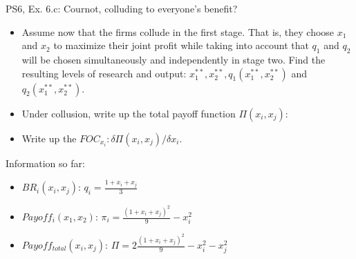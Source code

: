 \begin{frame}{PS6, Ex. 6.c: Cournot, colluding to everyone's benefit?}
    \begin{itemize}
    \item[(c)] Assume now that the firms collude in the first stage. That is, they choose $x_1$ and $x_2$ to maximize their joint profit while taking into account that $q_1$ and $q_2$ will be chosen simultaneously and independently in stage two. Find the resulting levels of research and output: $x_1^{**},x_2^{**},q_1(x_1^{**},x_2^{**})$ and $q_2(x_1^{**},x_2^{**})$.
    \end{itemize}
  \begin{multicols}{2}
    \begin{itemize}
      \item[(Step a)] Under collusion, write up the total payoff function $\Pi(x_i,x_j)$:
      \item[(Step b)] Write up the $FOC_{x_i}:\delta\Pi(x_i,x_j)/\delta x_i$.
    \end{itemize}
    \vfill\null \columnbreak
    Information so far:
    \begin{itemize}
      \item[1] $BR_i(x_i,x_j)$: $q_i = \frac{1+x_i+x_j}{3}$
      \item[2] $Payoff_i(x_1,x_2)$: $\pi_i=\frac{(1+x_i+x_j)^2}{9}-x_i^2$
      \item[3] $Payoff_{total}(x_i,x_j)$: $\Pi=2\frac{(1+x_i+x_j)^2}{9}-x_i^2-x_j^2$
    \end{itemize}
    \vfill\null
  \end{multicols}
\end{frame}
